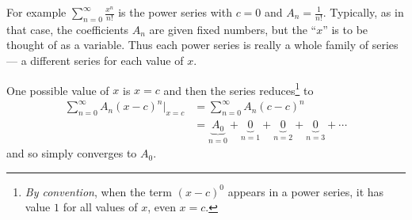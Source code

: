 For example $\sum_{n=0}^\infty \frac{x^n}{n!}$ is the power series
with $c=0$ and $A_n=\frac{1}{n!}$. Typically, as in that case,
the coefficients $A_n$ are given fixed numbers,
but the ``$x$'' is to be thought of as a variable.
Thus each power series is really a whole family of series ---
a different series for each value of $x$.

One possible value of $x$ is $x=c$ and then the series reduces\footnote{\emph{By convention}, when the term $(x-c)^0$
appears in a power series, it has value $1$ for all values of $x$,
even $x=c$.} to
\begin{align*}
\sum_{n=0}^\infty A_n (x-c)^n\Big|_{x=c}
 &=\sum_{n=0}^\infty A_n (c-c)^n\\
&=\underbrace{A_0}_{n=0}
+\underbrace{0}_{n=1}
+\underbrace{0}_{n=2}
+\underbrace{0}_{n=3}
+\cdots
\end{align*}
and so simply converges to $A_0$.

